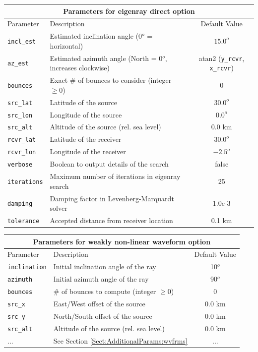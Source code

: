 \documentclass[10pt]{article}
\begin{document}
 \begin{tabular}{ | l | l | c | }
  \hline
   \multicolumn{3}{|c|}{\textbf{Parameters for eigenray direct option}} \\
   \hline
   Parameter & Description & Default Value \\
   \hline \hline
  \verb=incl_est= 		& Estimated inclination angle (0\(^o\) = horizontal)				& \(15.0^o\)	\\
  \verb=az_est= 		& Estimated azimuth angle (North = 0\(^o\), increases clockwise)	& atan2 (\verb=y_rcvr=, \verb=x_rcvr=) \\ \hline
  \verb=bounces=		& Exact \# of bounces to consider (integer \(\geq 0\)) 			& 0 \\ \hline
 \verb=src_lat= 			& Latitude of the source 									& \(30.0^o\) \\
 \verb=src_lon= 		& Longitude of the source									& \(0.0^o\) \\
 \verb=src_alt=  		& Altitude of the source (rel. sea level)						& \(0.0\) km \\ \hline
  \verb=rcvr_lat= 		& Latitude of the receiver									& \(30.0^o\)	\\
  \verb=rcvr_lon= 		& Longitude of the receiver								& \(-2.5^o\) \\ \hline
 \verb=verbose=		& Boolean to output details of the search						& false \\
 \verb=iterations=		& Maximum number of iterations in eigenray search				& 25 \\ 
 \verb=damping=		& Damping factor in Levenberg-Marquardt solver				& 1.0e-3 \\
 \verb=tolerance=		& Accepted distance from receiver location					& 0.1 km \\ \hline
 \end{tabular}

\vspace{0.01\textheight}

\begin{tabular}{ | l | l | c | }
  \hline
  \multicolumn{3}{|c|}{\textbf{Parameters for weakly non-linear waveform option}} \\
  \hline
  Parameter & Description & Default Value \\
 \hline \hline
 \verb=inclination=		& Initial inclination angle of the ray					& 10\(^o\) \\
 \verb=azimuth=		& Initial azimuth angle of the ray					& 90\(^o\) \\
 \verb=bounces=		& \# of bounces to compute (integer \(\geq 0\)) 			& 0 \\ \hline
 
 \verb=src_x=  			& East/West offset of the source						& \(0.0\) km \\
 \verb=src_y=  			& North/South offset of the source						& \(0.0\) km \\
 \verb=src_alt=  		& Altitude of the source (rel. sea level)					& \(0.0\) km \\ \hline
 ...					& See Section \ref{Sect:AdditionalParams:wvfrms}		& ... \\ \hline
\end{tabular}
\end{document}
